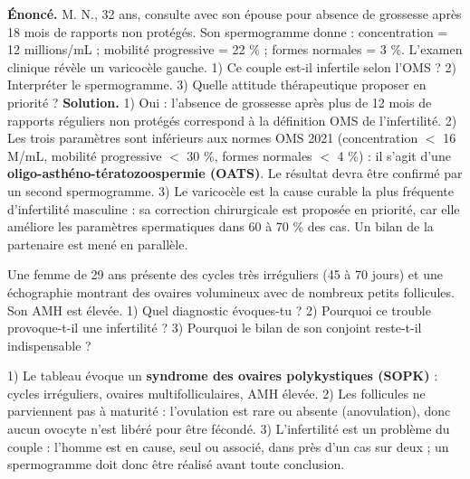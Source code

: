 \documentclass[11pt]{article}
\begin{document}
\begin{exoresolu}
\textbf{Énoncé.} M. N., 32 ans, consulte avec son épouse pour absence de grossesse après 18 mois de rapports non protégés. Son spermogramme donne : concentration = 12 millions/mL ; mobilité progressive = 22 \% ; formes normales = 3 \%. L'examen clinique révèle un varicocèle gauche. 1) Ce couple est-il infertile selon l'OMS ? 2) Interpréter le spermogramme. 3) Quelle attitude thérapeutique proposer en priorité ?
\tcblower
\textbf{Solution.} 1) Oui : l'absence de grossesse après plus de 12 mois de rapports réguliers non protégés correspond à la définition OMS de l'infertilité. 2) Les trois paramètres sont inférieurs aux normes OMS 2021 (concentration $<$ 16 M/mL, mobilité progressive $<$ 30 \%, formes normales $<$ 4 \%) : il s'agit d'une \textbf{oligo-asthéno-tératozoospermie (OATS)}. Le résultat devra être confirmé par un second spermogramme. 3) Le varicocèle est la cause curable la plus fréquente d'infertilité masculine : sa correction chirurgicale est proposée en priorité, car elle améliore les paramètres spermatiques dans 60 à 70 \% des cas. Un bilan de la partenaire est mené en parallèle.
\end{exoresolu}

\begin{exercice}
Une femme de 29 ans présente des cycles très irréguliers (45 à 70 jours) et une échographie montrant des ovaires volumineux avec de nombreux petits follicules. Son AMH est élevée. 1) Quel diagnostic évoques-tu ? 2) Pourquoi ce trouble provoque-t-il une infertilité ? 3) Pourquoi le bilan de son conjoint reste-t-il indispensable ?
\end{exercice}

\begin{corrige}[Exercice 1]
1) Le tableau évoque un \textbf{syndrome des ovaires polykystiques (SOPK)} : cycles irréguliers, ovaires multifolliculaires, AMH élevée. 2) Les follicules ne parviennent pas à maturité : l'ovulation est rare ou absente (anovulation), donc aucun ovocyte n'est libéré pour être fécondé. 3) L'infertilité est un problème du couple : l'homme est en cause, seul ou associé, dans près d'un cas sur deux ; un spermogramme doit donc être réalisé avant toute conclusion.
\end{corrige}
\end{document}
